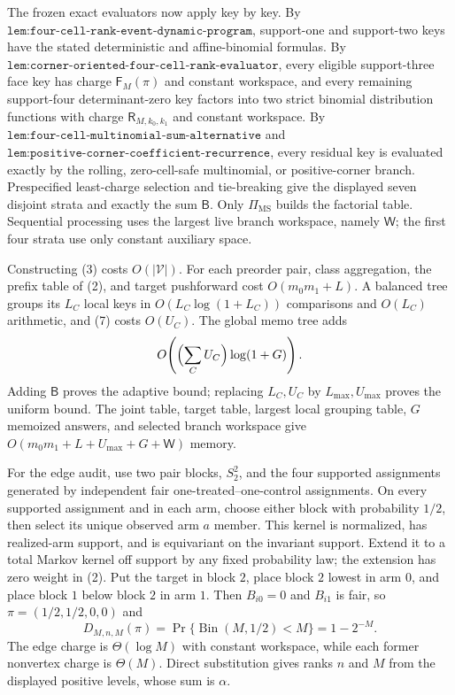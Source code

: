 The frozen exact evaluators now apply key by key. By \(\texttt{lem:four-cell-rank-event-dynamic-program}\), support-one and support-two keys have the stated deterministic and affine-binomial formulas. By \(\texttt{lem:corner-oriented-four-cell-rank-evaluator}\), every eligible support-three face key has charge \(\mathsf F_M(\pi)\) and constant workspace, and every remaining support-four determinant-zero key factors into two strict binomial distribution functions with charge \(\mathsf R_{M,k_0,k_1}\) and constant workspace. By \(\texttt{lem:four-cell-multinomial-sum-alternative}\) and \(\texttt{lem:positive-corner-coefficient-recurrence}\), every residual key is evaluated exactly by the rolling, zero-cell-safe multinomial, or positive-corner branch. Prespecified least-charge selection and tie-breaking give the displayed seven disjoint strata and exactly the sum \(\mathsf B\). Only \(\Pi_{\mathrm{MS}}\) builds the factorial table. Sequential processing uses the largest live branch workspace, namely \(\mathsf W\); the first four strata use only constant auxiliary space.

Constructing (3) costs \(O(|\mathcal V|)\). For each preorder pair, class aggregation, the prefix table of (2), and target pushforward cost \(O(m_0m_1+L)\). A balanced tree groups its \(L_C\) local keys in \(O(L_C\log(1+L_C))\) comparisons and \(O(L_C)\) arithmetic, and (7) costs \(O(U_C)\). The global memo tree adds
\[
O\!\left(\Bigl(\sum_CU_C\Bigr)\log(1+G)\right).
\]
Adding \(\mathsf B\) proves the adaptive bound; replacing \(L_C,U_C\) by \(L_{\max},U_{\max}\) proves the uniform bound. The joint table, target table, largest local grouping table, \(G\) memoized answers, and selected branch workspace give \(O(m_0m_1+L+U_{\max}+G+\mathsf W)\) memory.

For the edge audit, use two pair blocks, \(S_2^2\), and the four supported assignments generated by independent fair one-treated--one-control assignments. On every supported assignment and in each arm, choose either block with probability \(1/2\), then select its unique observed arm \(a\) member. This kernel is normalized, has realized-arm support, and is equivariant on the invariant support. Extend it to a total Markov kernel off support by any fixed probability law; the extension has zero weight in (2). Put the target in block \(2\), place block \(2\) lowest in arm \(0\), and place block \(1\) below block \(2\) in arm \(1\). Then \(B_{i0}=0\) and \(B_{i1}\) is fair, so \(\pi=(1/2,1/2,0,0)\) and
\[
D_{M,n,M}(\pi)=\Pr\{\operatorname{Bin}(M,1/2)<M\}=1-2^{-M}.
\]
The edge charge is \(\Theta(\log M)\) with constant workspace, while each former nonvertex charge is \(\Theta(M)\). Direct substitution gives ranks \(n\) and \(M\) from the displayed positive levels, whose sum is \(\alpha\).


